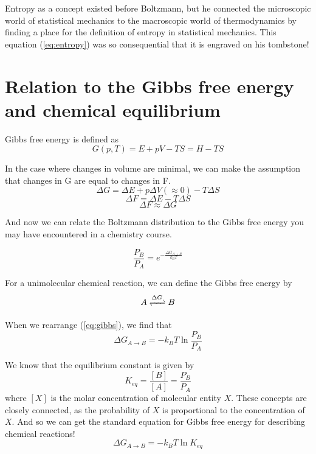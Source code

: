 Entropy as a concept existed before Boltzmann, but he connected the microscopic world of statistical mechanics to the macroscopic world of thermodynamics by finding a place for the definition of entropy in statistical mechanics.
This equation (\ref{eq:entropy}) was so consequential that it is engraved on his tombstone!

\section{Relation to the Gibbs free energy and chemical equilibrium}

Gibbs free energy is defined as 
\begin{equation}
    G(p,T) = E + pV - TS = H - TS
\end{equation}

In the case where changes in volume are minimal, we can make the assumption that changes in G are equal to changes in F.
\begin{equation}
    \Delta G = \Delta E + p\Delta V(\approx 0) - T\Delta S
\end{equation}
\begin{equation}
    \Delta F = \Delta E - T \Delta S
\end{equation}
\begin{equation}
    \Delta F \approx \Delta G
\end{equation}

And now we can relate the Boltzmann distribution to the Gibbs free energy you may have encountered in a chemistry course.

\begin{equation}
    \frac{P_B}{P_A} = e^{-\frac{\Delta G_{A \rightarrow B}}{k_BT}} \label{eq:gibbs}
\end{equation}

For a unimolecular chemical reaction, we can define the Gibbs free energy by
\begin{equation}
    A \xrightleftharpoons {\Delta G} B
\end{equation}

When we rearrange (\ref{eq:gibbs}), we find that
\begin{equation}
    \Delta G_{A \rightarrow B} = -k_BT\ln\frac{P_B}{P_A}
\end{equation}

We know that the equilibrium constant is given by
\begin{equation}
    K_{eq} = \frac{[B]}{[A]} = \frac{P_B}{P_A}
\end{equation}
where $[X]$ is the molar concentration of molecular entity $X$.
These concepts are closely connected, as the probability of $X$ is proportional to the concentration of $X$. 
And so we can get the standard equation for Gibbs free energy for describing chemical reactions!
\begin{equation}
    \Delta G_{A \rightarrow B} = -k_BT\ln K_{eq}
\end{equation}

